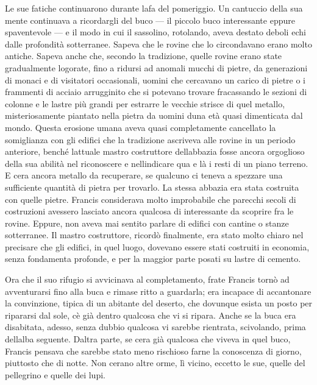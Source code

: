 Le sue fatiche continuarono durante l\textquotesingle afa del
pomeriggio. Un cantuccio della sua mente continuava a ricordargli del
buco --- il piccolo buco interessante eppure spaventevole --- e il modo
in cui il sassolino, rotolando, aveva destato deboli echi dalle
profondità sotterranee. Sapeva che le rovine che lo circondavano erano
molto antiche. Sapeva anche che, secondo la tradizione, quelle rovine
erano state gradualmente logorate, fino a ridursi ad anomali mucchi di
pietre, da generazioni di monaci e di visitatori occasionali, uomini che
cercavano un carico di pietre o i frammenti di acciaio arrugginito che
si potevano trovare fracassando le sezioni di colonne e le lastre più
grandi per estrarre le vecchie strisce di quel metallo, misteriosamente
piantato nella pietra da uomini d\textquotesingle una età quasi
dimenticata dal mondo. Questa erosione umana aveva quasi completamente
cancellato la somiglianza con gli edifici che la tradizione ascriveva
alle rovine in un periodo anteriore, benché l\textquotesingle attuale
mastro costruttore dell\textquotesingle abbazia fosse ancora orgoglioso
della sua abilità nel riconoscere e nell\textquotesingle indicare qua e
là i resti di un piano terreno. E c\textquotesingle era ancora metallo
da recuperare, se qualcuno ci teneva a spezzare una sufficiente quantità
di pietra per trovarlo. La stessa abbazia era stata costruita con quelle
pietre. Francis considerava molto improbabile che parecchi secoli di
costruzioni avessero lasciato ancora qualcosa di interessante da
scoprire fra le rovine. Eppure, non aveva mai sentito parlare di edifici
con cantine o stanze sotterranee. Il mastro costruttore, ricordò
finalmente, era stato molto chiaro nel precisare che gli edifici, in
quel luogo, dovevano essere stati costruiti in economia, senza
fondamenta profonde, e per la maggior parte posati su lastre di cemento.

Ora che il suo rifugio si avvicinava al completamento, frate Francis
tornò ad avventurarsi fino alla buca e rimase ritto a guardarla; era
incapace di accantonare la convinzione, tipica di un abitante del
deserto, che dovunque esista un posto per ripararsi dal sole,
c\textquotesingle è già dentro qualcosa che vi si ripara. Anche se la
buca era disabitata, adesso, senza dubbio qualcosa vi sarebbe rientrata,
scivolando, prima dell\textquotesingle alba seguente.
D\textquotesingle altra parte, se c\textquotesingle era già qualcosa che
viveva in quel buco, Francis pensava che sarebbe stato meno rischioso
farne la conoscenza di giorno, piuttosto che di notte. Non
c\textquotesingle erano altre orme, lì vicino, eccetto le sue, quelle
del pellegrino e quelle dei lupi.


